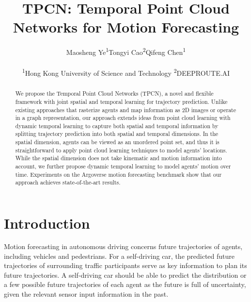 \documentclass[final]{cvpr}
\begin{document}
\title{TPCN: Temporal Point Cloud Networks for Motion Forecasting}

\author{
	\begin{tabular}{ p{2.8cm}<{\centering} p{2.8cm}<{\centering} p{2.8cm}<{\centering}}
Maosheng Ye\textsuperscript{1} & Tongyi Cao\textsuperscript{2}  & Qifeng Chen\textsuperscript{1} 
\end{tabular}\\
\textsuperscript{1}Hong Kong University of Science and Technology  \quad  \textsuperscript{2}DEEPROUTE.AI
}

\maketitle


\begin{abstract}
   We propose the Temporal Point Cloud Networks (TPCN), a novel and flexible framework with joint spatial and temporal learning for trajectory prediction. Unlike existing approaches that rasterize agents and map information as 2D images or operate in a graph representation, our approach extends ideas from point cloud learning with dynamic temporal learning to capture both spatial and temporal information by splitting trajectory prediction into both spatial and temporal dimensions. In the spatial dimension, agents can be viewed as an unordered point set, and thus it is straightforward to apply point cloud learning techniques to model agents' locations. While the spatial dimension does not take kinematic and motion information into account, we further propose dynamic temporal learning to model agents' motion over time. Experiments on the Argoverse motion forecasting benchmark show that our approach achieves state-of-the-art results.




\end{abstract}

\section{Introduction}

\let\thefootnote\relax{}


Motion forecasting in autonomous driving concerns future trajectories of agents, including vehicles and pedestrians. For a self-driving car, the predicted future trajectories of surrounding traffic participants serve as key information to plan its future trajectories. A self-driving car should be able to predict the distribution or a few possible future trajectories of each agent as the future is full of uncertainty, given the relevant sensor input information in the past.
\end{document}
